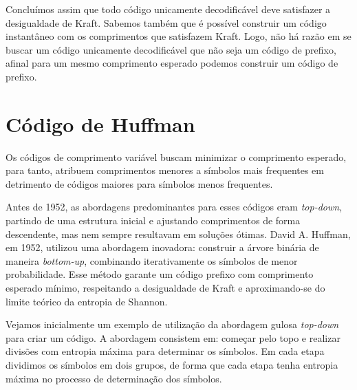 Concluímos assim que todo código unicamente decodificável deve satisfazer
a desigualdade de Kraft. Sabemos também que é possível construir um código
instantâneo com os comprimentos que satisfazem Kraft. Logo, não há razão 
em se buscar um código unicamente decodificável que não seja um código de
prefixo, afinal para um mesmo comprimento esperado podemos construir um
código de prefixo.




\section{Código de Huffman}

Os códigos de comprimento variável buscam minimizar o comprimento esperado,
para tanto, atribuem comprimentos menores a símbolos mais frequentes em detrimento
de códigos maiores para símbolos menos frequentes.

Antes de 1952, as abordagens predominantes para esses códigos eram
\emph{top-down}, partindo de uma estrutura inicial e ajustando comprimentos de forma
descendente, mas nem sempre resultavam em soluções ótimas.
David A. Huffman, em 1952, utilizou uma abordagem inovadora: construir a
árvore binária de maneira \emph{bottom-up}, combinando iterativamente os símbolos
de menor probabilidade. Esse método garante um código prefixo com comprimento
esperado mínimo, respeitando a desigualdade de Kraft e aproximando-se do limite
teórico da entropia de Shannon.

Vejamos inicialmente um exemplo de utilização da abordagem gulosa \emph{top-down}
para criar um código. A abordagem consistem em: começar pelo topo e 
realizar divisões com entropia máxima para determinar os símbolos.
Em cada etapa dividimos os símbolos em dois grupos, de forma que cada etapa
tenha entropia máxima no processo de determinação dos símbolos.

